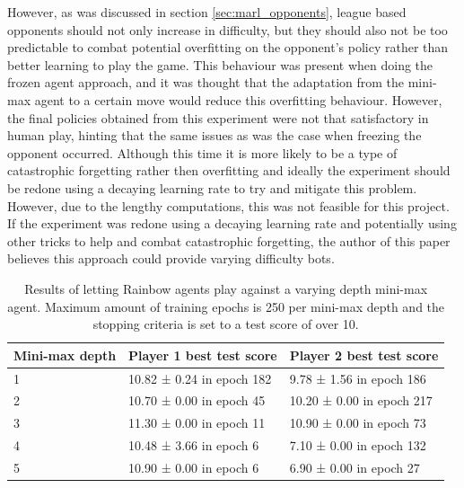 However, as was discussed in section \ref{sec:marl_opponents}, league based opponents should not only increase in difficulty, but they should also not be too predictable to combat potential overfitting on the opponent's policy rather than better learning to play the game.
This behaviour was present when doing the frozen agent approach, and it was thought that the adaptation from the mini-max agent to a certain move would reduce this overfitting behaviour.
However, the final policies obtained from this experiment were not that satisfactory in human play, hinting that the same issues as was the case when freezing the opponent occurred.
Although this time it is more likely to be a type of catastrophic forgetting rather then overfitting and ideally the experiment should be redone using a decaying learning rate to try and mitigate this problem.
However, due to the lengthy computations, this was not feasible for this project.
If the experiment was redone using a decaying learning rate and potentially using other tricks to help and combat catastrophic forgetting, the author of this paper believes this approach could provide varying difficulty bots. 

\begin{table}[ht]
    \centering
    \begin{tabular}{|l|l|l|}
    \hline
    \textbf{Mini-max depth} & \textbf{Player 1 best test score} & \textbf{Player 2 best test score} \\ \hline
    1                      & 10.82 ± 0.24 in epoch 182         & 9.78 ± 1.56 in epoch 186          \\ \hline
    2                      & 10.70 ± 0.00 in epoch 45          & 10.20 ± 0.00 in epoch 217         \\ \hline
    3                      & 11.30 ± 0.00 in epoch 11          & 10.90 ± 0.00 in epoch 73          \\ \hline
    4                      & 10.48 ± 3.66 in epoch 6           & 7.10 ± 0.00 in epoch 132          \\ \hline
    5                      & 10.90 ± 0.00 in epoch 6           & 6.90 ± 0.00 in epoch 27           \\ \hline
    \end{tabular}
    \captionsetup{width=0.9\linewidth}
    \captionsetup{justification=centering}
    \caption{\label{tab:minimax_learning} Results of letting Rainbow agents play against a varying depth mini-max agent. Maximum amount of training epochs is 250 per mini-max depth and the stopping criteria is set to a test score of over 10.}
\end{table}